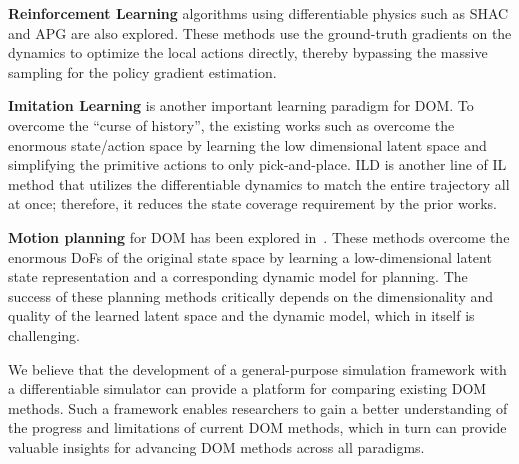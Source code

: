 \textbf{Reinforcement Learning} algorithms using differentiable physics such as SHAC \citep{SHAC} and APG \citep{Brax} are also explored. These methods use the ground-truth gradients on the dynamics to optimize the local actions directly, thereby bypassing the massive sampling for the policy gradient estimation. 

\textbf{Imitation Learning} is another important learning paradigm for DOM. 
To overcome the ``curse of history'', the existing works such as \citep{transporter, DOD_IL, VC_IL} overcome the enormous state/action space by learning the low dimensional latent space and simplifying the primitive actions to only pick-and-place. ILD \citep{ILD} is another line of IL method that utilizes the differentiable dynamics to match the entire trajectory all at once; therefore, it reduces the state coverage requirement by the prior works. 

\textbf{Motion planning} for DOM has been explored in~\citep{vidro, shen2022acid, VFMPlanning, HF_planning, CE_planning, gdoom}. These methods overcome the enormous DoFs of the original state space by learning a low-dimensional latent state representation and a corresponding dynamic model for planning. The success of these planning methods critically depends on the dimensionality and quality of the learned latent space and the dynamic model, which in itself is challenging. 

We believe that the development of a general-purpose simulation framework with a differentiable simulator can provide a platform for comparing existing DOM methods. Such a framework enables researchers to gain a better understanding of the progress and limitations of current DOM methods, which in turn can provide valuable insights for advancing DOM methods across all paradigms.

